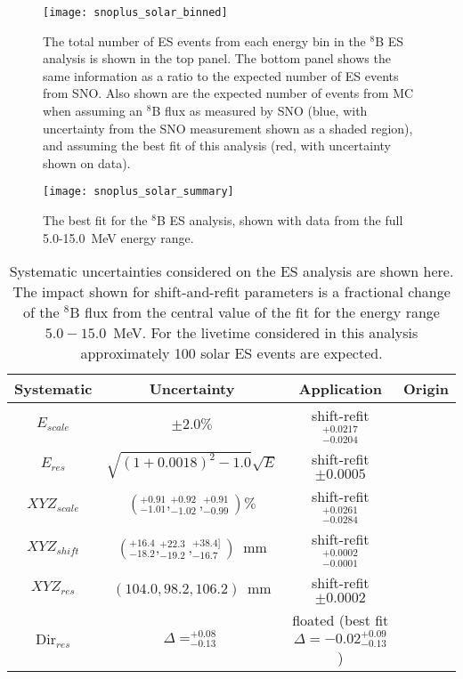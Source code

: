 \begin{figure}
\centering
\texttt{[image: snoplus\_solar\_binned]}
\caption{The total number of ES events from each energy bin in the {\snop} $^8$B ES analysis is shown in the top panel. 
The bottom panel shows the same information as a ratio to the expected number of ES events from SNO. 
Also shown are the expected number of events from MC when assuming an $^8$B flux as measured by SNO (blue, with uncertainty from the SNO measurement shown as a shaded region), and assuming the best fit of this analysis (red, with uncertainty shown on data).}
\label{fig:solar:binned}
\end{figure}

\begin{figure}
\centering
\texttt{[image: snoplus\_solar\_summary]}
\caption{The best fit for the {\snop} $^8$B ES analysis, shown with data from the full 5.0-15.0~MeV energy range.}
\label{fig:solar:summary}
\end{figure}

\begin{table}[]
\begin{center}
\begin{tabular}{c|c|c|c}
Systematic & Uncertainty & Application & Origin \\ \hline
$E_{scale}$     & $\pm 2.0\%$ & shift-refit $^{+0.0217}_{-0.0204}$ & \N \rule{0pt}{2.6ex}\rule[-1.2ex]{0pt}{0pt}  \\
$E_{res}$       & $\sqrt{(1+0.0018)^2-1.0}\sqrt{E}$ & shift-refit $\pm 0.0005$ & \N  \rule{0pt}{2.6ex}\rule[-1.2ex]{0pt}{0pt}  \\
${XYZ}_{scale}$ & $(^{+0.91}_{-1.01},^{+0.92}_{-1.02},^{+0.91}_{-0.99}) \%$ & shift-refit $^{+0.0261}_{-0.0284}$ & \N  \rule{0pt}{2.6ex}\rule[-1.2ex]{0pt}{0pt}  \\
${XYZ}_{shift}$ & $(^{+16.4}_{-18.2},^{+22.3}_{-19.2},^{+38.4]}_{-16.7})$~mm & shift-refit $^{+0.0002}_{-0.0001}$ & \N  \rule{0pt}{2.6ex}\rule[-1.2ex]{0pt}{0pt}  \\
${XYZ}_{res}$ & $(104.0,98.2,106.2)$~mm & shift-refit $\pm 0.0002$ & \N \rule{0pt}{2.6ex}\rule[-1.2ex]{0pt}{0pt}  \\
Dir$_{res}$     &  $\Delta = ^{+0.08}_{-0.13}$ & floated (best fit $\Delta = -0.02^{+0.09}_{-0.13}$) & \N \rule{0pt}{2.6ex}\rule[-1.2ex]{0pt}{0pt}  \\ \hline
\end{tabular}
\caption{ Systematic uncertainties considered on the {\snop} ES analysis are shown here.
The impact shown for shift-and-refit parameters is a fractional change of the $^8$B flux from the central value of the fit for the energy range $5.0-15.0$~MeV.
For the livetime considered in this analysis approximately 100 solar ES events are expected.}
\label{tbl:solar:systs}
\end{center}
\end{table}

